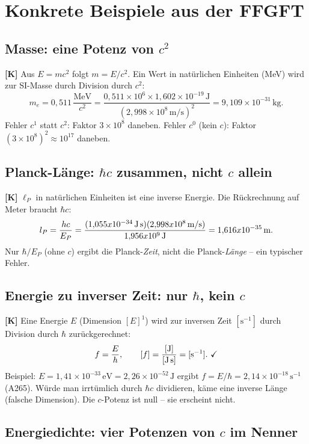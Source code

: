 \section{Konkrete Beispiele aus der FFGFT}

\subsection{Masse: eine Potenz von $c^2$}

\textbf{[K]} Aus $E=mc^2$ folgt $m=E/c^2$. Ein Wert in natürlichen Einheiten
(MeV) wird zur SI-Masse durch Division durch $c^2$:
\[
  m_e = 0{,}511\,\frac{\text{MeV}}{c^2}
  = \frac{0{,}511\times10^6\times1{,}602\times10^{-19}\,\text{J}}{(2{,}998\times10^8\,\text{m/s})^2}
  = 9{,}109\times10^{-31}\,\text{kg}.
\]
Fehler $c^1$ statt $c^2$: Faktor $3\times10^8$ daneben.
Fehler $c^0$ (kein $c$): Faktor $(3\times10^8)^2\approx10^{17}$ daneben.

\subsection{Planck-Länge: $\hbar c$ zusammen, nicht $c$ allein}

\textbf{[K]} $\ell_P$ in natürlichen Einheiten ist eine
inverse Energie. Die Rückrechnung auf Meter braucht $\hbar c$:
\[
  \ell_P = \frac{\hbar c}{E_P}
  = \frac{(1{,}055\times10^{-34}\,\text{J\,s})(2{,}998\times10^8\,\text{m/s})}
         {1{,}956\times10^9\,\text{J}}
  = 1{,}616\times10^{-35}\,\text{m}.
\]
Nur $\hbar/E_P$ (ohne $c$) ergibt die Planck-\emph{Zeit}, nicht die
Planck-\emph{Länge} -- ein typischer Fehler.

\subsection{Energie zu inverser Zeit: nur $\hbar$, kein $c$}

\textbf{[K]} Eine Energie $E$ (Dimension $[E]^1$) wird zur inversen Zeit
$[\text{s}^{-1}]$ durch Division durch $\hbar$ zurückgerechnet:
\[
  f = \frac{E}{\hbar},
  \qquad
  [f] = \frac{[\text{J}]}{[\text{J\,s}]} = [\text{s}^{-1}].\ \checkmark
\]
Beispiel: $E=1{,}41\times10^{-33}\,\text{eV}=2{,}26\times10^{-52}\,\text{J}$
ergibt $f=E/\hbar=2{,}14\times10^{-18}\,\text{s}^{-1}$ (A265).
Würde man irrtümlich durch $\hbar c$ dividieren, käme eine inverse Länge
(falsche Dimension). Die $c$-Potenz ist null -- sie erscheint nicht.

\subsection{Energiedichte: vier Potenzen von $c$ im Nenner}

